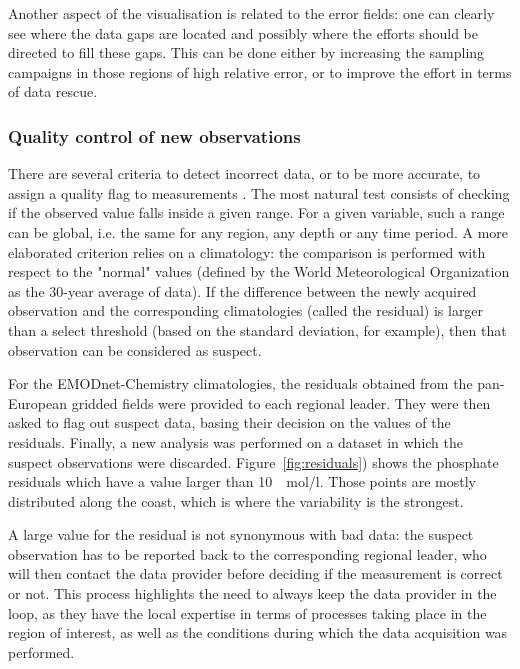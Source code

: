 \documentclass[essd, manuscript]{copernicus}
\begin{document}
Another aspect of the visualisation is related to the error fields: one can clearly see where the data gaps are located and possibly where the efforts should be directed to fill these gaps. This can be done either by increasing the sampling campaigns in those regions of high relative error, or to improve the effort in terms of data rescue.

\subsubsection{Quality control of new observations}

There are several criteria to detect incorrect data, or to be more accurate, to assign a quality flag to measurements \citep{CUMMINGS2011,CABANES2021}. The most natural test consists of checking if the observed value falls inside a given range. For a given variable, such a range can be global, i.e. the same for any region, any depth or any time period. A more elaborated criterion relies on a climatology: the comparison is performed with respect to the "normal" values (defined by the World Meteorological Organization as the 30-year average of data). If the difference between the newly acquired observation and the corresponding climatologies (called the residual) is larger than a select threshold (based on the standard deviation, for example), then that observation can be considered as suspect.

For the EMODnet-Chemistry climatologies, the residuals obtained from the pan-European gridded fields were provided to each regional leader. They were then asked to flag out suspect data, basing their decision on the values of the residuals. Finally, a new analysis was performed on a dataset in which the suspect observations were discarded. Figure~\ref{fig:residuals}) shows the phosphate residuals which have a value larger than 10~\unit{\mu~mol/l}. Those points are mostly distributed along the coast, which is where the variability is the strongest. 

A large value for the residual is not synonymous with bad data: the suspect observation has to be reported back to the corresponding regional leader, who will then contact the data provider before deciding if the measurement is correct or not. This process highlights the need to always keep the data provider in the loop, as they have the local expertise in terms of processes taking place in the region of interest, as well as the conditions during which the data acquisition was performed. 
\end{document}
